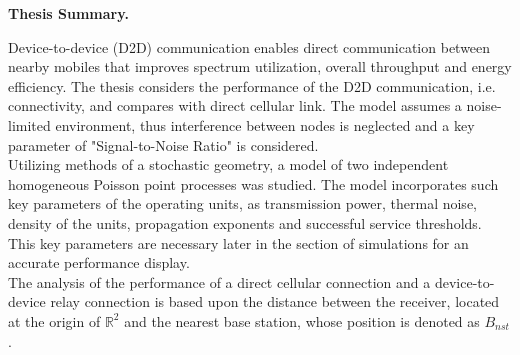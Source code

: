 \documentclass[10pt]{article}
\begin{document}
  \begin{center}
    {\bf Thesis Summary.}
  \end{center}
  Device-to-device (D2D) communication enables direct communication between nearby mobiles that improves spectrum utilization, overall throughput and energy efficiency. The thesis considers the performance of the D2D communication, i.e. connectivity, and compares with direct cellular link. The model assumes a noise-limited environment, thus interference between nodes is neglected and a key parameter of "Signal-to-Noise Ratio" is considered.
  \\ Utilizing methods of a stochastic geometry, a model of two independent homogeneous Poisson point processes was studied. The model incorporates such key parameters of the operating units, as transmission power, thermal noise, density of the units, propagation exponents and successful service thresholds. This key parameters are necessary later in the section of simulations for an accurate performance display.
  \\ The analysis of the performance of a direct cellular connection and a device-to-device relay connection is based upon the distance between the receiver, located at the origin of $\mathbb{R}^2$ and the nearest base station, whose position is denoted as $B_{nst}$.
  
\end{document}
